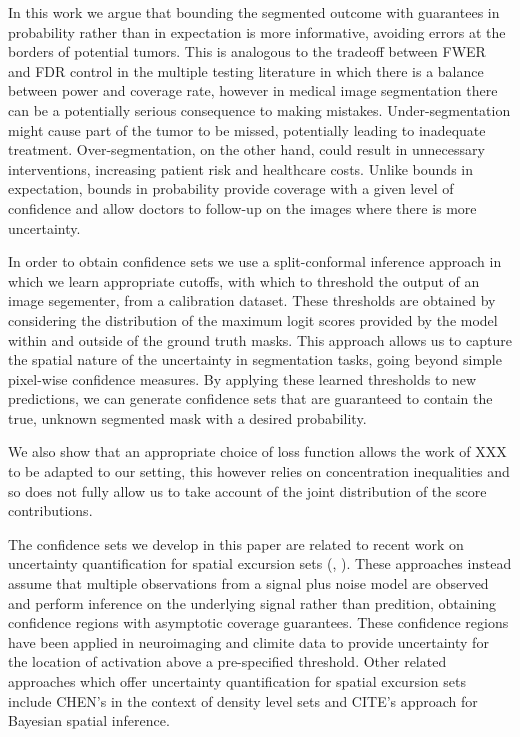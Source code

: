 In this work we argue that bounding the segmented outcome with guarantees in probability rather than in expectation is more informative, avoiding errors at the borders of potential tumors. This is analogous to the tradeoff between FWER and FDR control in the multiple testing literature in which there is a balance between power and coverage rate, however in medical image segmentation there can be a potentially serious consequence to making mistakes. Under-segmentation might cause part of the tumor to be missed, potentially leading to inadequate treatment. Over-segmentation, on the other hand, could result in unnecessary interventions, increasing patient risk and healthcare costs. Unlike bounds in expectation, bounds in probability provide coverage with a given level of confidence and allow doctors to follow-up on the images where there is more uncertainty.

In order to obtain confidence sets we use a split-conformal inference approach in which we learn appropriate cutoffs, with which to threshold the output of an image segementer, from a calibration dataset. These thresholds are obtained by considering the distribution of the maximum logit scores provided by the model within and outside of the ground truth masks. This approach allows us to capture the spatial nature of the uncertainty in segmentation tasks, going beyond simple pixel-wise confidence measures. By applying these learned thresholds to new predictions, we can generate confidence sets that are guaranteed to contain the true, unknown segmented mask with a desired probability. 

We also show that an appropriate choice of loss function allows the work of XXX to be adapted to our setting, this however relies on concentration inequalities and so does not fully allow us to take account of the joint distribution of the score contributions.

The confidence sets we develop in this paper are related to recent work on uncertainty quantification for spatial excursion sets (\cite{Sommerfield2018}, \cite{Telschow2023scope}). These approaches instead assume that multiple observations from a signal plus noise model are observed and perform inference on the underlying signal rather than predition, obtaining confidence regions with asymptotic coverage guarantees. These confidence regions have been applied in neuroimaging \citep{Bowring2019, Bowring2020} and climite data \cite{Ren} to provide uncertainty for the location of activation above a pre-specified threshold. Other related approaches which offer uncertainty quantification for spatial excursion sets include CHEN's in the context of density level sets and CITE's approach for Bayesian spatial inference.


